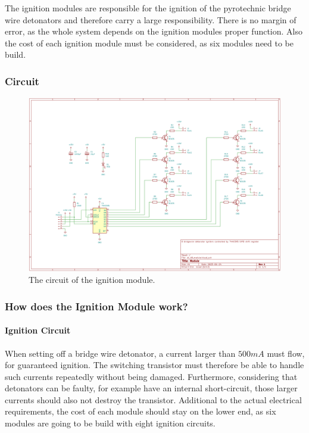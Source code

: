\noindent The ignition modules are responsible for the ignition of the pyrotechnic bridge wire detonators and therefore carry a large responsibility. There is no margin of error, as the whole system depends on the ignition modules proper function. Also the cost of each ignition module must be considered, as six modules need to be build.

\subsubsection{Circuit}

\begin{figure}[!ht]
    \centering
    \includegraphics[width=15cm]{./Figures/module_circuit.png}
    \caption{The circuit of the ignition module.}
    \label{fig:module_circuit}     
\end{figure}

\pagebreak

\subsubsection{How does the Ignition Module work?}
\label{Ignition Module work}
\paragraph{Ignition Circuit}

\noindent When setting off a bridge wire detonator, a current larger than $500mA$ must flow, for guaranteed ignition. The switching transistor must therefore be able to handle such currents repeatedly without being damaged. Furthermore, considering that detonators can be faulty, for example have an internal short-circuit, those larger currents should also not destroy the transistor. Additional to the actual electrical requirements, the cost of each module should stay on the lower end, as six modules are going to be build with eight ignition circuits.\\

